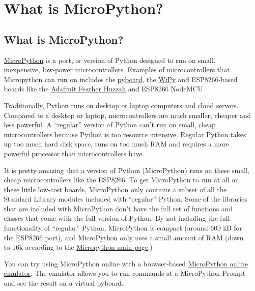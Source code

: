 \documentclass{book}
\begin{document}
    
        \section{What is MicroPython?}\label{what-is-micropython}
    




    
        \subsection{What is MicroPython?}\label{what-is-micropython}
    




    
        \href{http://micropython.org/}{MicroPython} is a port, or version of
Python designed to run on small, inexpensive, low-power
microcontrollers. Examples of microcontrollers that Micropython can run
on includes the \href{https://store.micropython.org/}{pyboard}, the
\href{https://pycom.io/development-boards}{WiPy} and ESP8266-based
boards like the
\href{https://learn.adafruit.com/adafruit-feather-huzzah-esp8266}{Adafruit
Feather Huzzah} and ESP8266 NodeMCU.

Traditionally, Python runs on desktop or laptop computers and cloud
servers. Compared to a desktop or laptop, microcontrollers are much
smaller, cheaper and less powerful. A ``regular'' version of Python
can't run on small, cheap microcontrollers because Python is too
resource intensive. Regular Python takes up too much hard disk space,
runs on too much RAM and requires a more powerful processor than
microcontrollers have.

It is pretty amazing that a version of Python (MicroPython) runs on
these small, cheap microcontrollers like the ESP8266. To get MicroPython
to run at all on these little low-cost boards, MicroPython only contains
a subset of all the Standard Library modules included with ``regular''
Python. Some of the libraries that are included with MicroPython don't
have the full set of functions and classes that come with the full
version of Python. By not including the full functionality of
``regular'' Python, MicroPython is compact (around 600 kB for the
ESP8266 port), and MicroPython only uses a small amount of RAM (down to
16k according to the \href{https://micropython.org/}{Micropython main
page}.)

You can try using MicroPython online with a browser-based
\href{https://micropython.org/unicorn/}{MicroPython online emulator}.
The emulator allows you to run commands at a MicroPython Prompt and see
the result on a virtual pyboard.
    
\end{document}
